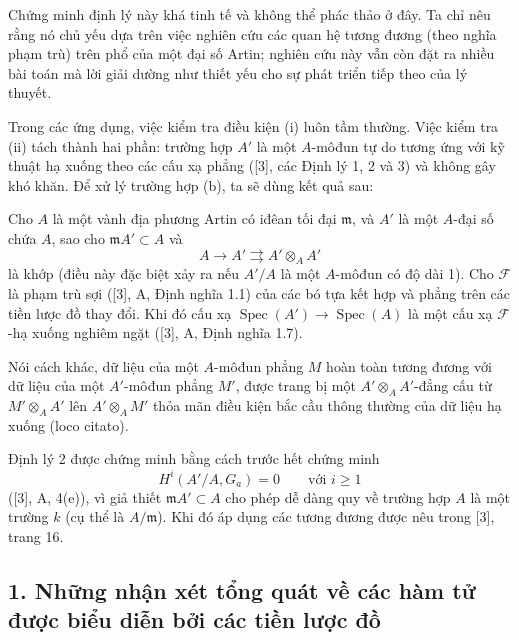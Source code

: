 Chứng minh định lý này khá tinh tế và không thể phác thảo ở đây. Ta chỉ nêu
rằng nó chủ yếu dựa trên việc nghiên cứu các quan hệ tương đương (theo nghĩa
phạm trù) trên phổ của một đại số Artin; nghiên cứu này vẫn còn đặt ra nhiều
bài toán mà lời giải dường như thiết yếu cho sự phát triển tiếp theo của lý
thuyết.

Trong các ứng dụng, việc kiểm tra điều kiện (i) luôn tầm thường. Việc kiểm tra
(ii) tách thành hai phần: trường hợp $A'$ là một $A$-môđun tự do tương ứng
với kỹ thuật hạ xuống theo các cấu xạ phẳng ([3], các Định lý 1, 2 và 3) và
không gây khó khăn. Để xử lý trường hợp (b), ta sẽ dùng kết quả sau:

 Cho $A$ là một vành địa phương Artin có iđêan tối đại
$\mathfrak m$, và $A'$ là một $A$-đại số chứa $A$, sao cho
$\mathfrak mA'\subset A$ và
\[
  A\longrightarrow A'\rightrightarrows A'\otimes_A A'
\]
là khớp (điều này đặc biệt xảy ra nếu $A'/A$ là một $A$-môđun có độ dài 1).
Cho $\mathcal F$ là phạm trù sợi ([3], A, Định nghĩa 1.1) của các bó tựa kết
hợp và phẳng trên các tiền lược đồ thay đổi. Khi đó cấu xạ
$\operatorname{Spec}(A')\longrightarrow\operatorname{Spec}(A)$ là một cấu
xạ $\mathcal F$-hạ xuống nghiêm ngặt ([3], A, Định nghĩa 1.7).

Nói cách khác, dữ liệu của một $A$-môđun phẳng $M$ hoàn toàn tương đương với
dữ liệu của một $A'$-môđun phẳng $M'$, được trang bị một
$A'\otimes_AA'$-đẳng cấu từ $M'\otimes_AA'$ lên $A'\otimes_AM'$ thỏa mãn
điều kiện bắc cầu thông thường của dữ liệu hạ xuống (loco citato).

Định lý 2 được chứng minh bằng cách trước hết chứng minh
\[
  H^i(A'/A,G_a)=0\qquad\text{với }i\geq 1
\]
([3], A, 4(e)), vì giả thiết $\mathfrak mA'\subset A$ cho phép dễ dàng quy về
trường hợp $A$ là một trường $k$ (cụ thể là $A/\mathfrak m$). Khi đó áp dụng
các tương đương được nêu trong [3], trang 16.


\subsection*{1. Những nhận xét tổng quát về các hàm tử được biểu diễn bởi các tiền lược đồ}

